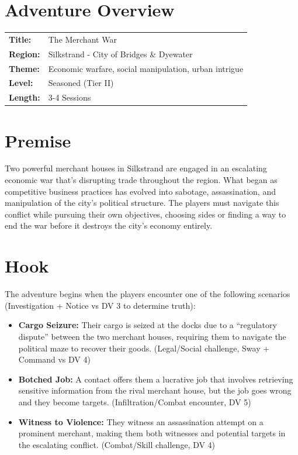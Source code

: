 \documentclass[11pt]{article}
\begin{document}




\section*{Adventure Overview}

\begin{tabularx}{\textwidth}{@{}lX@{}}
\textbf{Title:} & The Merchant War \\
\textbf{Region:} & Silkstrand - City of Bridges \& Dyewater \\
\textbf{Theme:} & Economic warfare, social manipulation, urban intrigue \\
\textbf{Level:} & Seasoned (Tier II) \\
\textbf{Length:} & 3-4 Sessions \\
\end{tabularx}


\section{Premise}

Two powerful merchant houses in Silkstrand are engaged in an escalating economic war that's disrupting trade throughout the region. What began as competitive business practices has evolved into sabotage, assassination, and manipulation of the city's political structure. The players must navigate this conflict while pursuing their own objectives, choosing sides or finding a way to end the war before it destroys the city's economy entirely.

\section{Hook}

The adventure begins when the players encounter one of the following scenarios (Investigation + Notice vs DV 3 to determine truth):
\begin{itemize}
\item \textbf{Cargo Seizure:} Their cargo is seized at the docks due to a ``regulatory dispute'' between the two merchant houses, requiring them to navigate the political maze to recover their goods. (Legal/Social challenge, Sway + Command vs DV 4)
\item \textbf{Botched Job:} A contact offers them a lucrative job that involves retrieving sensitive information from the rival merchant house, but the job goes wrong and they become targets. (Infiltration/Combat encounter, DV 5)
\item \textbf{Witness to Violence:} They witness an assassination attempt on a prominent merchant, making them both witnesses and potential targets in the escalating conflict. (Combat/Skill challenge, DV 4)
\end{itemize}
\end{document}
